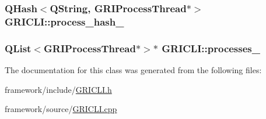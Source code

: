 \hypertarget{classGRICLI_a4ff8ac76c1ca18864685470f08f11726}{
\subsubsection[{process\-\_\-hash\-\_\-}]{\setlength{\rightskip}{0pt plus 5cm}\-Q\-Hash$<$\-Q\-String, {\bf \-G\-R\-I\-Process\-Thread}$\ast$$>$ {\bf \-G\-R\-I\-C\-L\-I\-::process\-\_\-hash\-\_\-}}}\label{classGRICLI_a4ff8ac76c1ca18864685470f08f11726}
\hypertarget{classGRICLI_aec943cc82eb1af73f5e07100ade7407a}{
\subsubsection[{processes\-\_\-}]{\setlength{\rightskip}{0pt plus 5cm}\-Q\-List$<${\bf \-G\-R\-I\-Process\-Thread}$\ast$$>$$\ast$ {\bf \-G\-R\-I\-C\-L\-I\-::processes\-\_\-}}}\label{classGRICLI_aec943cc82eb1af73f5e07100ade7407a}


\-The documentation for this class was generated from the following files\-:\begin{DoxyCompactItemize}
\item 
framework/include/\hyperlink{GRICLI_8h}{\-G\-R\-I\-C\-L\-I.\-h}\item 
framework/source/\hyperlink{GRICLI_8cpp}{\-G\-R\-I\-C\-L\-I.\-cpp}\end{DoxyCompactItemize}
